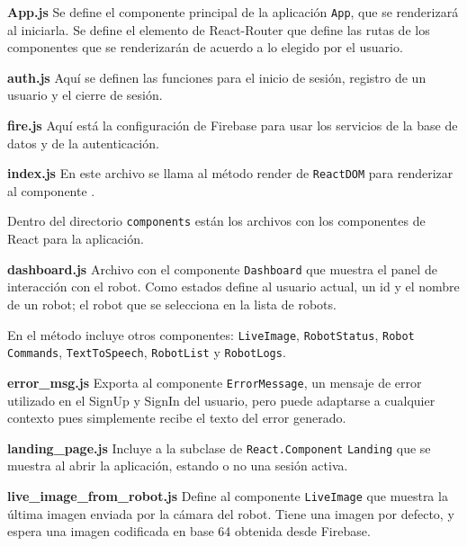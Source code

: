 \textbf{App.js}
\label{\detokenize{code_docs:app-js}}
Se define el componente principal de la aplicación \texttt{App}, que se renderizará
al iniciarla. Se define el elemento  de React-Router
que define las rutas de los componentes que se renderizarán de acuerdo a lo
elegido por el usuario.


\textbf{auth.js}
\label{\detokenize{code_docs:auth-js}}
Aquí se definen las funciones para el inicio de sesión, registro de un usuario
y el cierre de sesión.


\textbf{fire.js}
\label{\detokenize{code_docs:fire-js}}
Aquí está la configuración de Firebase para usar los servicios de la base de datos
y de la autenticación.



\textbf{index.js}
\label{\detokenize{code_docs:index-js}}
En este archivo se llama al método render de \texttt{ReactDOM} para renderizar al
componente .


Dentro del directorio \texttt{components} están los archivos con los componentes de React para la aplicación.

\textbf{dashboard.js}
\label{\detokenize{code_docs:dashboard-js}}
Archivo con el componente \texttt{Dashboard} que muestra el panel de interacción con el robot.
Como estados define al usuario actual, un id y el nombre de un robot; el robot
que se selecciona en la lista de robots.

En el método  incluye otros componentes:
\texttt{LiveImage},
\texttt{RobotStatus},
\texttt{Robot\\Commands},
\texttt{TextToSpeech},
\texttt{RobotList} y
\texttt{RobotLogs}.


\textbf{error\_msg.js}
\label{\detokenize{code_docs:error-msg-js}}
Exporta al componente \texttt{ErrorMessage}, un mensaje de error utilizado en el SignUp y SignIn del usuario, pero puede
adaptarse a cualquier contexto pues simplemente recibe el texto del error
generado.

\textbf{landing\_page.js}
\label{\detokenize{code_docs:landing-page-js}}
Incluye a la subclase de \texttt{React.Component} \texttt{Landing} que se muestra al abrir la aplicación, estando o no una sesión
activa.


\textbf{live\_image\_from\_robot.js}
\label{\detokenize{code_docs:live-image-from-robot-js}}
Define al componente \texttt{LiveImage} que muestra la última imagen enviada por la cámara del robot. Tiene una imagen por
defecto, y espera una imagen codificada en base 64 obtenida desde Firebase.


